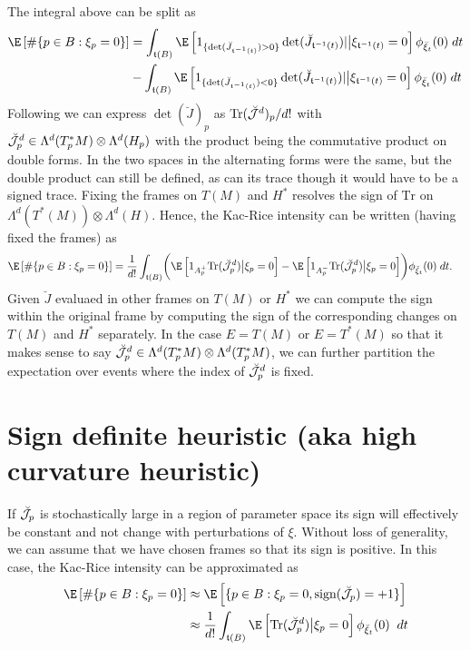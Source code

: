 \documentclass{article}
\begin{document}
The integral above can be split as
$$
\begin{aligned}
\E \left[\# \{p \in B: \xi_p=0\} \right] &= \int_{\coordchart(B)} \E \left[1_{\{\det(\breve{J}_{\coordchart^{-1}(t)}) > 0\}}\det(\breve{J}_{\coordchart^{-1}(t)})| \bigr | \xi_{\coordchart^{-1}(t)}=0 \right] \phi_{\breve{\xi}_t}(0) \; dt \\
& - \int_{\coordchart(B)} \E \left[1_{\{\det(\breve{J}_{\coordchart^{-1}(t)}) < 0\}}\det(\breve{J}_{\coordchart^{-1}(t)})| \bigr | \xi_{\coordchart^{-1}(t)}=0 \right] \phi_{\breve{\xi}_t}(0) \; dt \\
\end{aligned}
$$
Following \cite{ECmanifolds,Federer} we can express $\det(\breve{J})_p$ as $\text{Tr}(\breve{\cal J}^d)_p/d!$
with $\breve{\cal J}^d_p \in \Lambda^d(T^*_pM) \otimes \Lambda^d(H_p)$ with the product being
the commutative product on double forms. In \cite{ECmanifolds,Federer} the two spaces in the alternating
forms were the same, but the double product can still be defined, as can its trace though it would have to be
a signed trace. Fixing the frames on $T(M)$ and $H^*$ resolves the sign of $\text{Tr}$ on
$\Lambda^d(T^*(M)) \otimes \Lambda^d(H)$. Hence, the
Kac-Rice intensity can be written (having fixed the frames) as
$$
\begin{aligned}
\E \left[\# \{p \in B: \xi_p=0\} \right] &= \frac{1}{d!} \int_{\coordchart(B)} \biggl( \E \left[1_{A^+_p} \text{Tr}(\breve{\cal J}_p^d) \bigl| \xi_p=0\right]   - \E \left[1_{A^-_p} \text{Tr}(\breve{\cal J}_p^d) \bigl| \xi_p=0\right] \biggr) \phi_{\breve{\xi}_t}(0) \; dt.
\end{aligned}
$$
Given $\breve{J}$ evaluaed in other frames on $T(M)$ or $H^*$ we can compute the sign within the original frame by computing the sign of the corresponding changes on $T(M)$ and $H^*$ separately.
In the case $E=T(M)$ or $E=T^*(M)$ so that
it makes sense to say $\breve{\cal J}^d_p \in \Lambda^d(T^*_pM) \otimes \Lambda^d(T^*_pM)$, we can further partition the expectation over events where the index of $\breve{\cal J}^d_p$ is fixed.

\section{Sign definite heuristic (aka high curvature heuristic)}

If $\breve{\cal J}_p$ is stochastically large in a region of parameter space its
sign will effectively be constant and not change with perturbations
of $\xi$. Without loss of generality, we can assume that we have chosen frames so that its sign is positive.
In this case, the Kac-Rice intensity can be approximated as
\begin{equation}
  \label{eq:sign:definite}
\begin{aligned}
\E \left[\# \{p \in B: \xi_p=0\} \right] & \approx \E \left[\{p \in B: \xi_p=0, \text{sign}(\breve{\cal J}_p)=+1\} \right] \\
& \approx \frac{1}{d!} \int_{\coordchart(B)} \E \left[ \text{Tr}(\breve{\cal J}_p^d) \bigl| \xi_p=0\right] \phi_{\breve{\xi}_t}(0) \; \; dt
\end{aligned}
  \end{equation}
\end{document}
